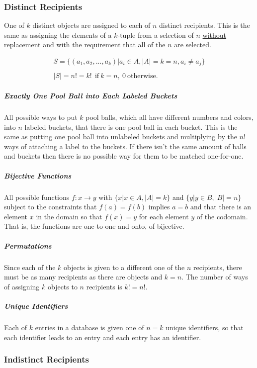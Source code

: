 \subsubsection{Distinct Recipients}
One of $k$ distinct objects are assigned to each of $n$ distinct recipients. This is the same as assigning the elements of a $k$-tuple from a selection of $n$ \underline{without} replacement and with the requirement that all of the $n$ are selected.

\begin{equation}	
\begin{array}{l}
S = \{ (a_1,a_2,...,a_k) | a_i \in A, |A| = k = n, a_i\neq a_j\}\\
\\
|S| = n! = k!\ \ \mathrm{if\ }k=n,\ 0\ \mathrm{otherwise.}
\end{array}
\end{equation}

\subparagraph{Exactly One Pool Ball into Each Labeled Buckets} All possible ways to put $k$ pool balls, which all have different numbers and colors, into $n$ labeled buckets, that there is one pool ball in each bucket. This is the same as putting one pool ball into unlabeled buckets and multiplying by the $n!$ ways of attaching a label to the buckets. If there isn't the same amount of balls and buckets then there is no possible way for them to be matched one-for-one.

\subparagraph{Bijective Functions} All possible functions $f:x \rightarrow y$ with $\{x | x\in A, |A| = k \}$ and $\{y | y\in B, |B| = n\}$ subject to the constraints that $f(a) = f(b)$ implies $a=b$ and that there is an element $x$ in the domain so that $f(x)=y$ for each element $y$ of the codomain. That is, the functions are one-to-one and onto, of bijective.

\subparagraph{Permutations} Since each of the $k$ objects is given to a different one of the $n$ recipients, there must be as many recipients as there are objects and $k=n$. The number of ways of assigning $k$ objects to $n$ recipients is $k!=n!$.

\subparagraph{Unique Identifiers} Each of $k$ entries in a database is given one of $n=k$ unique identifiers, so that each identifier leads to an entry and each entry has an identifier. 

\subsubsection{Indistinct Recipients}

